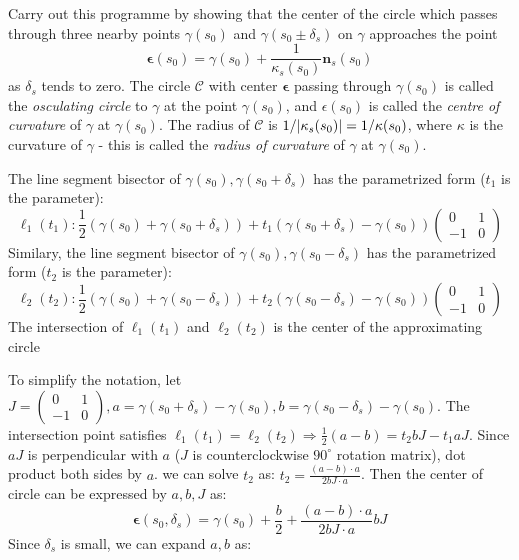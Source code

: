 \documentclass{article}
\DeclarePairedDelimiter\abs{\lvert}{\rvert}
\begin{document}
\begin{enumerate}
Carry out this programme by showing that the center of the circle which passes through three nearby points $\gamma(s_0)$ and $\gamma(s_0\pm \delta_s)$ on $
\gamma$ approaches the point
\begin{equation}\label{eq:center_of_circle}
\bm{\epsilon}(s_0) = \gamma(s_0) + \frac{1}{\kappa_s(s_0)}\bm{n}_s(s_0)
\end{equation}
as $\delta_s$ tends to zero. The circle $\mathcal{C}$ with center $\bm{\epsilon}$ passing through $\gamma(s_0)$ is called the \textit{osculating circle} to $\gamma$ at the point $\gamma(s_0)$, and $\epsilon(s_0)$ is called the \textit{centre of curvature} of $\gamma$ at $\gamma(s_0)$. The radius of $\mathcal{C}$
is $1/\abs{\kappa_s(s_0)}=1/\kappa(s_0)$, where $\kappa$ is the curvature of $\gamma$ - this is called the \textit{radius of curvature} of $\gamma$ at $\gamma(s_0)$.
\begin{solution}
The line segment bisector of $\gamma(s_0),\gamma(s_0+\delta_s)$ has the parametrized form ($t_1$ is the parameter): 
$$
\ell_1(t_1): \frac{1}{2}(\gamma(s_0)+\gamma(s_0+\delta_s)) + t_1 (\gamma(s_0+\delta_s)-\gamma(s_0))\begin{pmatrix}0 & 1 \\ -1 & 0\end{pmatrix}
$$
Similary, the line segment bisector of $\gamma(s_0),\gamma(s_0-\delta_s)$ has the parametrized form ($t_2$ is the parameter): 
$$
\ell_2(t_2): \frac{1}{2}(\gamma(s_0)+\gamma(s_0-\delta_s)) + t_2 (\gamma(s_0-\delta_s)-\gamma(s_0))\begin{pmatrix}0 & 1 \\ -1 & 0\end{pmatrix} 
$$
The intersection of $\ell_1(t_1)$ and $\ell_2(t_2)$ is the center of the approximating circle
\end{solution}
To simplify the notation, let $J=\begin{pmatrix}0 & 1 \\ -1 & 0\end{pmatrix},a=\gamma(s_0+\delta_s)-\gamma(s_0),b=\gamma(s_0-\delta_s)-\gamma(s_0)$.
The intersection point satisfies $\ell_1(t_1)=\ell_2(t_2) \Rightarrow \frac{1}{2}(a-b)=t_2bJ-t_1aJ$.
Since $aJ$ is perpendicular with $a$ ($J$ is counterclockwise $90^\circ$ rotation matrix), dot product both sides by $a$. we can solve $t_2$ as:
$t_2=\frac{(a-b)\cdot a}{2bJ\cdot a}$.
Then the center of circle can be expressed by $a,b,J$ as:
$$
\bm{\epsilon}(s_0,\delta_s)=\gamma(s_0)+\frac{b}{2}+\frac{(a-b)\cdot a}{2bJ\cdot a} bJ
$$
Since $\delta_s$ is small, we can expand $a,b$ as:

\end{enumerate}
\end{document}
